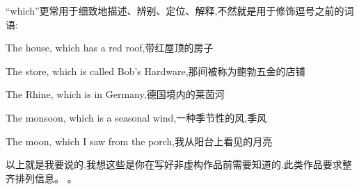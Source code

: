 “which”更常用于细致地描述、辨别、定位、解释,不然就是用于修饰逗号之前的词语:

The house, which has a red roof,带红屋顶的房子

The store, which is called Bob’s Hardware,那间被称为鲍勃五金的店铺

The Rhine, which is in Germany,德国境内的莱茵河

The monsoon, which is a seasonal wind,一种季节性的风,季风

The moon, which I saw from the porch,我从阳台上看见的月亮

以上就是我要说的,我想这些是你在写好非虚构作品前需要知道的,此类作品要求整齐排列信息。 。